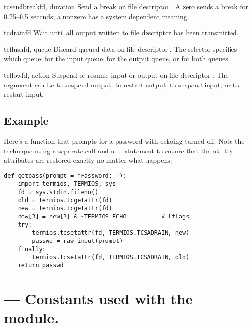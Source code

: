 \begin{funcdesc}{tcsendbreak}{fd, duration}
Send a break on file descriptor .  A zero  sends
a break for 0.25--0.5 seconds; a nonzero  has a system
dependent meaning.
\end{funcdesc}

\begin{funcdesc}{tcdrain}{fd}
Wait until all output written to file descriptor  has been
transmitted.
\end{funcdesc}

\begin{funcdesc}{tcflush}{fd, queue}
Discard queued data on file descriptor .  The 
selector specifies which queue:  for the
input queue,  for the output queue, or
 for both queues.
\end{funcdesc}

\begin{funcdesc}{tcflow}{fd, action}
Suspend or resume input or output on file descriptor .  The
 argument can be  to suspend
output,  to restart output,
 to suspend input, or
 to restart input. 
\end{funcdesc}

\subsection{Example}

Here's a function that prompts for a password with echoing turned
off.  Note the technique using a separate  call
and a  ...  statement to ensure that the
old tty attributes are restored exactly no matter what happens:

\begin{verbatim}
def getpass(prompt = "Password: "):
    import termios, TERMIOS, sys
    fd = sys.stdin.fileno()
    old = termios.tcgetattr(fd)
    new = termios.tcgetattr(fd)
    new[3] = new[3] & ~TERMIOS.ECHO          # lflags
    try:
        termios.tcsetattr(fd, TERMIOS.TCSADRAIN, new)
        passwd = raw_input(prompt)
    finally:
        termios.tcsetattr(fd, TERMIOS.TCSADRAIN, old)
    return passwd
\end{verbatim}

\section{ ---
         Constants used with the  module.}

